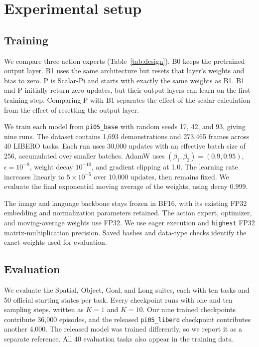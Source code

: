 \documentclass[10pt]{article}
\begin{document}
\section{Experimental setup}
\subsection{Training}

We compare three action experts (Table~\ref{tab:design}). B0 keeps the pretrained output layer. B1 uses the same architecture but resets that layer's weights and bias to zero. P is Scalar-Pi and starts with exactly the same weights as B1. B1 and P initially return zero updates, but their output layers can learn on the first training step. Comparing P with B1 separates the effect of the scalar calculation from the effect of resetting the output layer.

We train each model from \texttt{pi05\_base} with random seeds 17, 42, and 93, giving nine runs. The dataset contains 1,693 demonstrations and 273,465 frames across 40 LIBERO tasks. Each run uses 30,000 updates with an effective batch size of 256, accumulated over smaller batches. AdamW uses $(\beta_1,\beta_2)=(0.9,0.95)$, $\epsilon=10^{-8}$, weight decay $10^{-10}$, and gradient clipping at 1.0. The learning rate increases linearly to $5\times10^{-5}$ over 10,000 updates, then remains fixed. We evaluate the final exponential moving average of the weights, using decay 0.999.

The image and language backbone stays frozen in BF16, with its existing FP32 embedding and normalization parameters retained. The action expert, optimizer, and moving-average weights use FP32. We use eager execution and \texttt{highest} FP32 matrix-multiplication precision. Saved hashes and data-type checks identify the exact weights used for evaluation.

\subsection{Evaluation}
\label{sec:evaluation}
We evaluate the Spatial, Object, Goal, and Long suites, each with ten tasks and 50 official starting states per task. Every checkpoint runs with one and ten sampling steps, written as $K=1$ and $K=10$. Our nine trained checkpoints contribute 36,000 episodes, and the released \texttt{pi05\_libero} checkpoint contributes another 4,000. The released model was trained differently, so we report it as a separate reference. All 40 evaluation tasks also appear in the training data.
\end{document}

